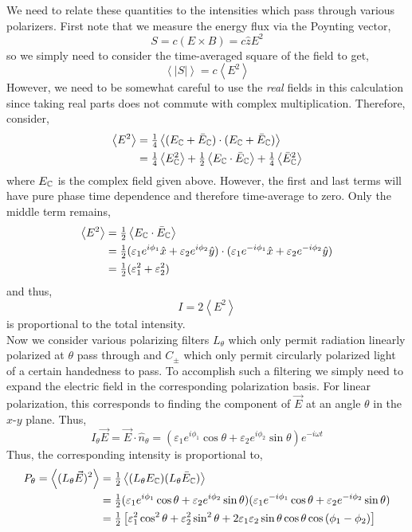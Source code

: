 \documentclass[12pt]{article}
\begin{document}
We need to relate these quantities to the intensities which pass through various polarizers. First note that we measure the energy flux via the Poynting vector,
\[ S = c ( E \times B) = c \hat{z} E^2 \]
so we simply need to consider the time-averaged square of the field to get,
\[ \left< |S| \right> = c \left< E^2 \right> \] 
However, we need to be somewhat careful to use the \textit{real} fields in this calculation since taking real parts does not commute with complex multiplication. Therefore, consider,
\begin{align*}
\left< E^2 \right> & = \tfrac{1}{4} \left< (E_{\mathbb{C}} + \bar{E}_{\mathbb{C}}) \cdot (E_{\mathbb{C}} + \bar{E}_{\mathbb{C}}) \right>
\\
& = \tfrac{1}{4}  \left< E_{\mathbb{C}}^2 \right> + \tfrac{1}{2}  \left< E_{\mathbb{C}} \cdot \bar{E}_{\mathbb{C}} \right> + \tfrac{1}{4}  \left< \bar{E}_{\mathbb{C}}^2 \right>
\end{align*}
where $E_{\mathbb{C}}$ is the complex field given above. However, the first and last terms will have pure phase time dependence and therefore time-average to zero. Only the middle term remains,
\begin{align*}
\left< E^2 \right>  & = \tfrac{1}{2}  \left< E_{\mathbb{C}} \cdot \bar{E}_{\mathbb{C}} \right>
\\
& = \tfrac{1}{2} (\varepsilon_1 e^{i \phi_1} \hat{x} + \varepsilon_2 e^{i \phi_2} \hat{y}) \cdot (\varepsilon_1 e^{-i \phi_1} \hat{x} + \varepsilon_2 e^{-i \phi_2} \hat{y})
\\
& = \tfrac{1}{2} (\varepsilon_1^2 + \varepsilon_2^2)
\end{align*}
and thus,
\[ I = 2 \left< E^2 \right> \]
is proportional to the total intensity. 
\bigskip\\
Now we consider various polarizing filters $L_\theta$ which only permit radiation linearly polarized at $\theta$ pass through and $C_\pm$ which only permit circularly polarized light of a certain handedness to pass. To accomplish such a filtering we simply need to expand the electric field in the corresponding polarization basis. For linear polarization, this corresponds to finding the component of $\vec{E}$ at an angle $\theta$ in the $x$-$y$ plane. Thus,
\[ I_\theta \vec{E} = \vec{E} \cdot \hat{n}_\theta = (\varepsilon_1 e^{i \phi_1} \cos{\theta} + \varepsilon_2 e^{i \phi_2} \sin{\theta}) e^{-i \omega t} \]
Thus, the corresponding intensity is proportional to,
\begin{align*}
P_\theta = \left< (L_\theta \vec{E})^2 \right> & = \tfrac{1}{2} \left< (L_\theta E_{\mathbb{C}})(L_\theta \bar{E}_{\mathbb{C}}) \right> 
\\
& = \tfrac{1}{2} (\varepsilon_1 e^{i \phi_1} \cos{\theta} + \varepsilon_2 e^{i \phi_2} \sin{\theta}) (\varepsilon_1 e^{-i \phi_1} \cos{\theta} + \varepsilon_2 e^{-i \phi_2} \sin{\theta})
\\
& = \tfrac{1}{2} \left[ \varepsilon_1^2 \cos^2{\theta} + \varepsilon_2^2 \sin^2{\theta} + 2 \varepsilon_1 \varepsilon_2 \sin{\theta} \cos{\theta} \cos{(\phi_1 - \phi_2)} \right] 
\end{align*}
\end{document}
